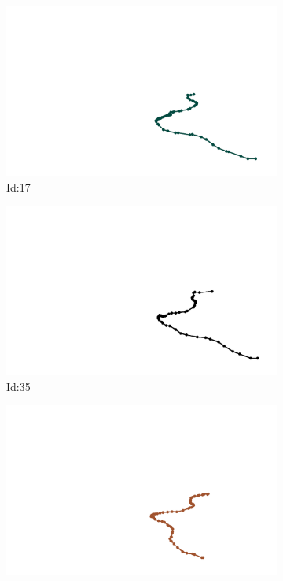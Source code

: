 \documentclass[12pt,twoside]{report}
\begin{document}
\begin{figure}
\centering
\begin{subfigure}[b]{0.20\textwidth}
\centering
\includegraphics[width=\textwidth]{../../trajectories/17.png}
\caption{Id:17}
\end{subfigure}
\begin{subfigure}[b]{0.20\textwidth}
\centering
\includegraphics[width=\textwidth]{../../trajectories/35.png}
\caption{Id:35}
\end{subfigure}
\begin{subfigure}[b]{0.20\textwidth}
\centering
\includegraphics[width=\textwidth]{../../trajectories/317.png}

\end{subfigure}
\end{figure}
\end{document}
